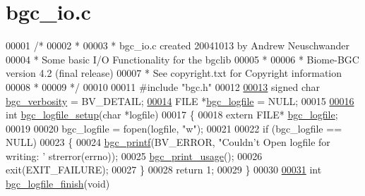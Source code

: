 \hypertarget{bgc__io_8c_source}{}\section{bgc\+\_\+io.\+c}
\label{bgc__io_8c_source}

\begin{DoxyCode}
00001 \textcolor{comment}{/*}
00002 \textcolor{comment}{ *}
00003 \textcolor{comment}{ *  bgc\_io.c created 20041013 by Andrew Neuschwander}
00004 \textcolor{comment}{ *  Some basic I/O Functionality for the bgclib}
00005 \textcolor{comment}{ *}
00006 \textcolor{comment}{ *  Biome-BGC version 4.2 (final release)}
00007 \textcolor{comment}{ *  See copyright.txt for Copyright information}
00008 \textcolor{comment}{ *}
00009 \textcolor{comment}{ */}
00010 
00011 \textcolor{preprocessor}{#include "bgc.h"}
00012 
\hypertarget{bgc__io_8c_source_l00013}{}\hyperlink{bgc__io_8c_ac2c427ea256a1e3e279e5d21d2017f04}{00013} \textcolor{keywordtype}{signed} \textcolor{keywordtype}{char} \hyperlink{bgc__io_8c_ac2c427ea256a1e3e279e5d21d2017f04}{bgc\_verbosity} = BV\_DETAIL;
\hypertarget{bgc__io_8c_source_l00014}{}\hyperlink{bgc__io_8c_a176fee5c0e3671a626cd8ec7d1cc1be8}{00014} FILE *\hyperlink{bgc__io_8c_a176fee5c0e3671a626cd8ec7d1cc1be8}{bgc\_logfile} = NULL;
00015 
\hypertarget{bgc__io_8c_source_l00016}{}\hyperlink{bgc__io_8c_a45fe30c0d757941d37c6b09858307458}{00016} \textcolor{keywordtype}{int} \hyperlink{bgc__io_8c_a45fe30c0d757941d37c6b09858307458}{bgc\_logfile\_setup}(\textcolor{keywordtype}{char} *logfile)
00017 \{
00018     \textcolor{keyword}{extern} FILE* \hyperlink{bgc__io_8c_a176fee5c0e3671a626cd8ec7d1cc1be8}{bgc\_logfile};
00019     
00020     bgc\_logfile = fopen(logfile, \textcolor{stringliteral}{"w"});
00021 
00022     \textcolor{keywordflow}{if} (bgc\_logfile == NULL)
00023     \{
00024         \hyperlink{bgc__io_8c_af287cce6e2aede1ce337de9319e80d0d}{bgc\_printf}(BV\_ERROR, \textcolor{stringliteral}{"Couldn't Open logfile for writing: '%
      strerror(errno));
00025         \hyperlink{bgc__io_8c_adcf0cce6fdd3c3d3531f826bede8bb66}{bgc\_print\_usage}();
00026         exit(EXIT\_FAILURE);
00027     \}
00028     \textcolor{keywordflow}{return} 1;
00029 \}
00030 
\hypertarget{bgc__io_8c_source_l00031}{}\hyperlink{bgc__io_8c_a368b68b05ba7af113b2fbd032c124b0e}{00031} \textcolor{keywordtype}{int} \hyperlink{bgc__io_8c_a368b68b05ba7af113b2fbd032c124b0e}{bgc\_logfile\_finish}(\textcolor{keywordtype}{void})
}
\end{DoxyCode}
